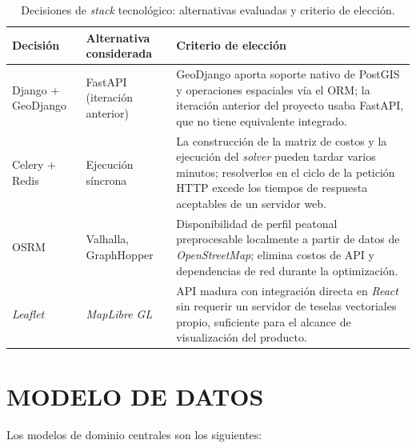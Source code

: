 \begin{table}[H]
  \centering
  \caption{Decisiones de \textit{stack} tecnológico: alternativas evaluadas y criterio de elección.}
  \label{tab:stack-decisions}
  \small
  \begin{tabularx}{\textwidth}{@{}l l X@{}}
    \toprule
    Decisión & Alternativa considerada & Criterio de elección \\
    \midrule
    Django + GeoDjango & FastAPI (iteración anterior) & GeoDjango aporta soporte nativo de PostGIS y operaciones espaciales vía el ORM; la iteración anterior del proyecto usaba FastAPI, que no tiene equivalente integrado. \\[4pt]
    Celery + Redis & Ejecución síncrona & La construcción de la matriz de costos y la ejecución del \textit{solver} pueden tardar varios minutos; resolverlos en el ciclo de la petición HTTP excede los tiempos de respuesta aceptables de un servidor web. \\[4pt]
    OSRM & Valhalla, GraphHopper & Disponibilidad de perfil peatonal preprocesable localmente a partir de datos de \textit{OpenStreetMap}; elimina costos de API y dependencias de red durante la optimización. \\[4pt]
    \textit{Leaflet} & \textit{MapLibre GL} & API madura con integración directa en \textit{React} sin requerir un servidor de teselas vectoriales propio, suficiente para el alcance de visualización del producto. \\
    \bottomrule
  \end{tabularx}
\end{table}

\section{MODELO DE DATOS}
\label{sec:modelo-datos}

Los modelos de dominio centrales son los siguientes:


